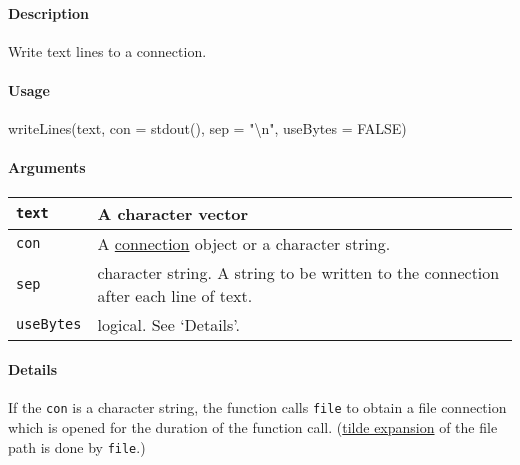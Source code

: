\documentclass[
]{article}
\newenvironment{Shaded}{}{}
\newcommand{\NormalTok}[1]{#1}
\begin{document}
\hypertarget{description-2}{%
\paragraph{Description}\label{description-2}}

Write text lines to a connection.

\hypertarget{usage}{%
\paragraph{Usage}\label{usage}}

\begin{Shaded}
\begin{Highlighting}[]
\NormalTok{writeLines(text, con = stdout(), sep = "\textbackslash{}n", useBytes = FALSE)}
\end{Highlighting}
\end{Shaded}

\hypertarget{arguments}{%
\paragraph{Arguments}\label{arguments}}

\begin{longtable}[]{@{}ll@{}}
\toprule\noalign{}
\texttt{text} & A character vector \\
\midrule\noalign{}
\endhead
\bottomrule\noalign{}
\endlastfoot
\texttt{con} & A
\href{vscode-webview://00i87qrgljff0t3jmc9gjufilst9usetvkh9gn773om0ic67o1j2/base/help/connection}{connection}
object or a character string. \\
\texttt{sep} & character string. A string to be written to the
connection after each line of text. \\
\texttt{useBytes} & logical. See `Details'. \\
\end{longtable}

\hypertarget{details}{%
\paragraph{Details}\label{details}}

If the \texttt{con} is a character string, the function calls
\texttt{file} to obtain a file connection which is opened for the
duration of the function call.
(\href{vscode-webview://00i87qrgljff0t3jmc9gjufilst9usetvkh9gn773om0ic67o1j2/base/help/tilde\%20expansion}{tilde
expansion} of the file path is done by \texttt{file}.)
\end{document}
